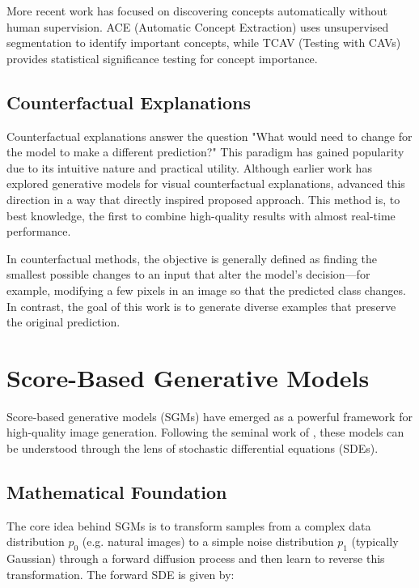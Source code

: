 \documentclass[licencjacka,en]{pracamgr}
\begin{document}
More recent work has focused on discovering concepts automatically without human supervision. ACE (Automatic Concept Extraction) \citep{ghorbani2019automaticconceptbasedexplanations} uses unsupervised segmentation to identify important concepts, while TCAV (Testing with CAVs) \citep{kim2018interpretabilityfeatureattributionquantitative} provides statistical significance testing for concept importance.

\subsection{Counterfactual Explanations}

Counterfactual explanations answer the question "What would need to change for the model to make a different prediction?" This paradigm has gained popularity due to its intuitive nature and practical utility. Although earlier work has explored generative models for visual counterfactual explanations, \citep{sobieski2024rethinkingvisualcounterfactualexplanations} advanced this direction in a way that directly inspired proposed approach. This method is, to best knowledge, the first to combine high-quality results with almost real-time performance.

In counterfactual methods, the objective is generally defined as finding the smallest possible changes to an input that alter the model’s decision—for example, modifying a few pixels in an image so that the predicted class changes. In contrast, the goal of this work is to generate diverse examples that preserve the original prediction.

\section{Score-Based Generative Models}\label{sec:sgm_background}

Score-based generative models (SGMs) have emerged as a powerful framework for high-quality image generation. Following the seminal work of \citep{song2021scorebasedgenerativemodelingstochastic}, these models can be understood through the lens of stochastic differential equations (SDEs).

\subsection{Mathematical Foundation}

The core idea behind SGMs is to transform samples from a complex data distribution $p_0$ (e.g. natural images) to a simple noise distribution $p_1$ (typically Gaussian) through a forward diffusion process and then learn to reverse this transformation. The forward SDE is given by:
\end{document}
